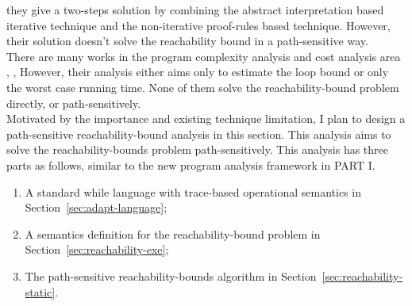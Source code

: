     they give a two-steps solution by combining the abstract interpretation based iterative technique
    and the non-iterative proof-rules based technique.
    However, their solution doesn't solve the reachability
    bound in a path-sensitive way.
    \\
    There are many works in the program complexity analysis and cost analysis area
    \cite{GustafssonEL05, HumenbergerJK18}, 
    \cite{BrockschmidtEFFG16,AlbertAGP08,AliasDFG10,Flores-MontoyaH14}, 
    However, their analysis either aims only to estimate the loop bound
    or only the worst case running time.
    None of them solve the reachability-bound problem directly, or path-sensitively.
    \\
    Motivated by the importance and existing technique limitation,
    I plan to design a path-sensitive reachability-bound analysis in this section.
    This analysis aims to solve the 
    reachability-bounds problem path-sensitively.
    This analysis has three parts as follows, similar to the new program analysis framework in PART I.
    \begin{enumerate}
      \item A standard while language with trace-based operational semantics in Section~\ref{sec:adapt-language};
      \item A semantics definition for the reachability-bound problem in Section~\ref{sec:reachability-exe};
      \item The path-sensitive reachability-bounds algorithm in Section~\ref{sec:reachability-static}.
   \end{enumerate}
